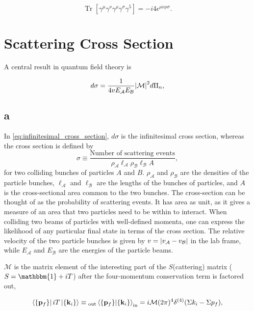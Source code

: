 \documentclass[11pt, a4paper]{amsart}
\DeclareMathOperator{\Tr}{Tr}
\begin{document}
\begin{equation}
\Tr[\gamma^\mu\gamma^\nu\gamma^\rho\gamma^\sigma\gamma^5] = -i4\epsilon^{\mu\nu\rho\sigma}.
\end{equation}

\section{Scattering Cross Section}

A central result in quantum field theory is

\begin{equation}
\label{eq:infinitesimal_cross_section}
d\sigma = \frac{1}{4vE_\mathcal{A}E_\mathcal{B}} \abs{\mathcal{M}}^2 d\Pi_n,
\end{equation}

\subsection*{a}
In \autoref{eq:infinitesimal_cross_section}, $d\sigma$ is the infinitesimal cross section, whereas the cross section is defined by 
\begin{equation}
\sigma \equiv \frac{\text{Number of scattering events}}{\rho_\mathcal{A}\ell_\mathcal{A}\rho_\mathcal{B}\ell_\mathcal{B} A},
\end{equation}
for two colliding bunches of particles $A$  and $B$. $\rho_\mathcal{A}$ and $\rho_\mathcal{B}$ are the densities of the particle bunches, $\ell_\mathcal{A}$ and $\ell_\mathcal{B}$ are the lengths of the bunches of particles, and $A$ is the cross-sectional area common to the two bunches. The cross-section can be thought of as the probability of scattering events. It has area as unit, as it gives a measure of an area that two particles need to be within to interact. When colliding two beams of particles with well-defined momenta, one can express the likelihood of any particular final state in terms of the cross section. The relative velocity of the two particle bunches is given by $v = \abs{v_\mathcal{A} - v_\mathcal{B}}$ in the lab frame, while $E_\mathcal{A}$ and $E_\mathcal{B}$ are the energies of the particle beams.

$\mathcal{M}$ is the matrix element of the interesting part of the $S$(cattering) matrix ($S = \mathbbm{1} + i T$) after the four-momentum conservation term is factored out,

\begin{equation}
\bra{\{\vb{p}_f\}}iT\ket{\{\vb{k}_i\}} 
\equiv {}_{\text{out}}\braket{\{\vb{p}_f\}}{\{\vb{k}_i\}}_\text{in}
= i\mathcal{M}(2\pi)^4 \delta^{(4)}(\Sigma k_i - \Sigma p_f),
\end{equation}
\end{document}

